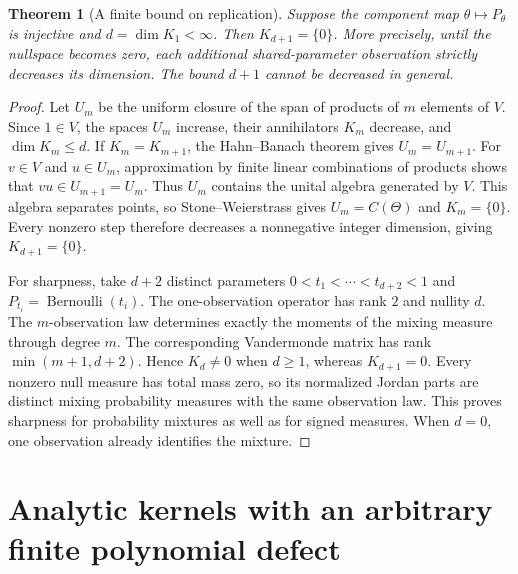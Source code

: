 \documentclass[11pt,letterpaper]{article}
\newtheorem{theorem}{Theorem}[section]
\theoremstyle{definition}
\theoremstyle{remark}
\newcommand{\1}{\mathbf 1}
\begin{document}
\begin{theorem}[A finite bound on replication]
\label{p10:thm:finite-defect-replication}
Suppose the component map $\theta\mapsto P_\theta$ is injective and
$d=\dim K_1<\infty$.  Then $K_{d+1}=\{0\}$.  More precisely, until the
nullspace becomes zero, each additional shared-parameter observation strictly
decreases its dimension.  The bound $d+1$ cannot be decreased in general.
\end{theorem}

\begin{proof}
Let $U_m$ be the uniform closure of the span of products of $m$ elements of
$V$.  Since $1\in V$, the spaces $U_m$ increase, their annihilators $K_m$
decrease, and $\dim K_m\leq d$.  If $K_m=K_{m+1}$, the Hahn--Banach theorem
gives $U_m=U_{m+1}$.  For $v\in V$ and $u\in U_m$, approximation by finite
linear combinations of products shows that $vu\in U_{m+1}=U_m$.  Thus $U_m$
contains the unital algebra generated by $V$.  This algebra separates points,
so Stone--Weierstrass gives $U_m=C(\Theta)$ and $K_m=\{0\}$.  Every nonzero
step therefore decreases a nonnegative integer dimension, giving
$K_{d+1}=\{0\}$.

For sharpness, take $d+2$ distinct parameters
$0<t_1<\cdots<t_{d+2}<1$ and $P_{t_i}=\operatorname{Bernoulli}(t_i)$.
The one-observation operator has rank $2$ and nullity $d$.  The
$m$-observation law determines exactly the moments of the mixing measure
through degree $m$.  The corresponding Vandermonde matrix has rank
$\min(m+1,d+2)$.  Hence $K_d\neq0$ when $d\geq1$, whereas $K_{d+1}=0$.
Every nonzero null measure has total mass zero, so its normalized Jordan
parts are distinct mixing probability measures with the same observation
law.  This proves sharpness for probability mixtures as well as for signed
measures.  When $d=0$, one observation already identifies the mixture.
\end{proof}



\section{Analytic kernels with an arbitrary finite polynomial defect}
\label{p10:sec:legendre-finite-defect}
\end{document}
